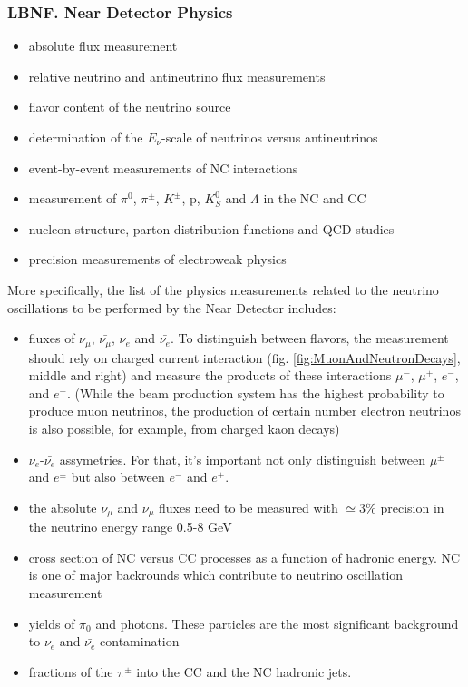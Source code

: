\begin{frame}\frametitle{LBNF. Near Detector Physics}
\scriptsize
\tiny
\begin{itemize}
  \item absolute flux measurement
  \item relative neutrino and antineutrino flux measurements
  \item flavor content of the neutrino source
  \item determination of the $E_\nu$-scale of neutrinos versus antineutrinos
  \item event-by-event measurements of NC interactions
  \item measurement of $\pi^0$, $\pi^\pm$, $K^\pm$, p, $K^0_S$ and $\Lambda$ in the NC and CC
  \item nucleon structure, parton distribution functions and QCD studies
  \item precision measurements of electroweak physics
\end{itemize}

More specifically, the list of the physics measurements related to the neutrino oscillations to be performed by the Near Detector includes:
\begin{itemize}
  \item fluxes of $\nu_\mu$, $\bar{\nu_\mu}$, $\nu_e$ and $\bar{\nu_e}$. To distinguish between flavors, the measurement should rely on charged current interaction (fig. \ref{fig:MuonAndNeutronDecays}, middle and right) and measure the products of these interactions $\mu^-$, $\mu^+$, $e^-$, and $e^+$. (While the beam production system has the highest probability to produce muon neutrinos, the production of certain number electron neutrinos is also possible, for example, from charged kaon decays)
  \item $\nu_e$-$\bar{\nu_e}$ assymetries. For that, it's important not only distinguish between $\mu^\pm$ and $e^\pm$ but also between $e^-$ and $e^+$.
  \item the absolute $\nu_\mu$ and $\bar{\nu_\mu}$ fluxes need to be measured with $\simeq{3\%}$ precision in the neutrino energy range 0.5-8 GeV
  \item cross section of NC versus CC processes as a function of hadronic energy. NC is one of major backrounds which contribute to neutrino oscillation measurement
  \item yields of $\pi_0$ and photons. These particles are the most significant background to $\nu_e$ and $\bar{\nu_e}$ contamination
  \item fractions of the $\pi^\pm$ into the CC and the NC hadronic jets.    
\end{itemize} 
\end{frame}
